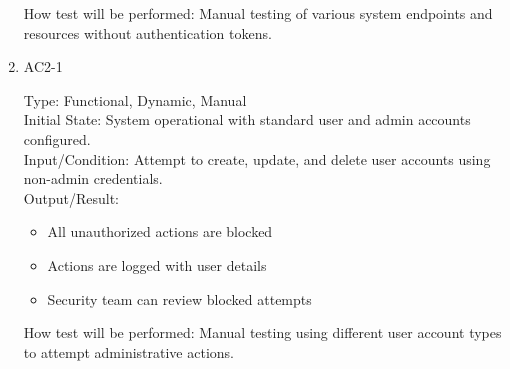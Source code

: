 \documentclass[12pt, titlepage]{article}
\begin{document}
\begin{enumerate}
    How test will be performed: Manual testing of various system endpoints and resources without authentication tokens.

    \item{AC2-1\\}
    
    Type: Functional, Dynamic, Manual\\
    
    Initial State: System operational with standard user and admin accounts configured.\\
    
    Input/Condition: Attempt to create, update, and delete user accounts using non-admin credentials.\\
    
    Output/Result:
    \begin{itemize}
        \item All unauthorized actions are blocked
        \item Actions are logged with user details
        \item Security team can review blocked attempts
    \end{itemize}
    
    How test will be performed: Manual testing using different user account types to attempt administrative actions.
\end{enumerate}
\end{document}
